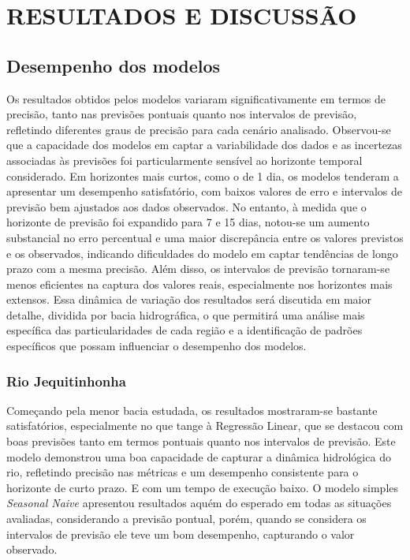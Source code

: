 \chapter{RESULTADOS E DISCUSS\~AO}
\label{cap:capitulo4}

\section{Desempenho dos modelos}

Os resultados obtidos pelos modelos variaram significativamente em termos de precisão, tanto nas previsões pontuais quanto nos intervalos de previsão, refletindo diferentes graus de precisão para cada cenário analisado. Observou-se que a capacidade dos modelos em captar a variabilidade dos dados e as incertezas associadas às previsões foi particularmente sensível ao horizonte temporal considerado. Em horizontes mais curtos, como o de 1 dia, os modelos tenderam a apresentar um desempenho satisfatório, com baixos valores de erro e intervalos de previsão bem ajustados aos dados observados. No entanto, à medida que o horizonte de previsão foi expandido para 7 e 15 dias, notou-se um aumento substancial no erro percentual e uma maior discrepância entre os valores previstos e os observados, indicando dificuldades do modelo em captar tendências de longo prazo com a mesma precisão. Além disso, os intervalos de previsão tornaram-se menos eficientes na captura dos valores reais, especialmente nos horizontes mais extensos. Essa dinâmica de variação dos resultados será discutida em maior detalhe, dividida por bacia hidrográfica, o que permitirá uma análise mais específica das particularidades de cada região e a identificação de padrões específicos que possam influenciar o desempenho dos modelos.

\subsection{Rio Jequitinhonha}

Começando pela menor bacia estudada, os resultados mostraram-se bastante satisfatórios, especialmente no que tange à Regressão Linear, que se destacou com boas previsões tanto em termos pontuais quanto nos intervalos de previsão. Este modelo demonstrou uma boa capacidade de capturar a dinâmica hidrológica do rio, refletindo precisão nas métricas e um desempenho consistente para o horizonte de curto prazo. E com um tempo de execução baixo. O modelo simples \textit{Seasonal Naive} apresentou resultados aquém do esperado em todas as situações avaliadas, considerando a previsão pontual, porém, quando se considera os intervalos de previsão ele teve um bom desempenho, capturando o valor observado.

